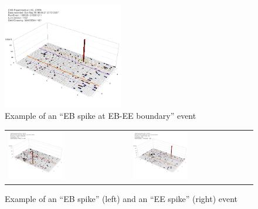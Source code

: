 %
\begin{figure}[h]
 \centering
   \includegraphics[width=0.47\textwidth]{fig/EBspikeAtBorder.png} 
\caption{Example of an ``EB spike at EB-EE boundary'' event}
\label{fig:EBspikeAtBorder}
\end{figure}

%
\begin{figure}[h]
 \centering
 \begin{tabular}{ll}
   \includegraphics[width=0.47\textwidth]{fig/EBspike.png} &
   \includegraphics[width=0.47\textwidth]{fig/EEspike.png} \\
 \end{tabular}
\caption{Example of an ``EB spike'' (left) and an ``EE spike'' (right) event}
\label{fig:EBEEspike}
\end{figure}


